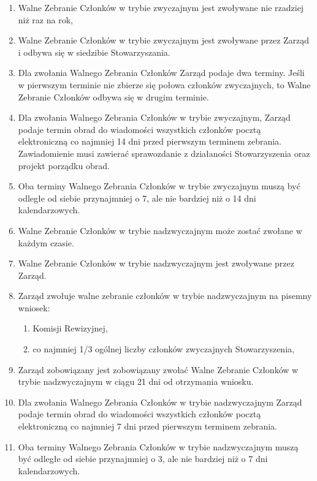 \documentclass[a4paper,draft,10pt]{article}
\begin{document}
\begin{enumerate}
\begin{enumerate}
	        \item Walne Zebranie Członków w trybie zwyczajnym jest zwoływane nie rzadziej niż raz na rok,
	        \item Walne Zebranie Członków w trybie zwyczajnym jest zwoływane przez Zarząd i odbywa się w siedzibie Stowarzyszania.
	    \item Dla zwołania Walnego Zebrania Członków Zarząd podaje dwa terminy. Jeśli w pierwszym terminie nie zbierze się połowa członków zwyczajnych, to Walne Zebranie Członków odbywa się w drugim terminie.
	    \item Dla zwołania Walnego Zebrania Członków w trybie zwyczajnym, Zarząd podaje termin obrad do wiadomości wszystkich członków pocztą elektroniczną co najmniej 14 dni przed pierwszym terminem zebrania. Zawiadomienie musi zawierać sprawozdanie z działaności Stowarzyszenia oraz projekt porządku obrad.
	    \item Oba terminy Walnego Zebrania Członków w trybie zwyczajnym muszą być odległe od siebie przynajmniej o 7, ale nie bardziej niż o 14 dni kalendarzowych.
	    \item Walne Zebranie Członków w trybie nadzwyczajnym może zostać zwołane w każdym czasie.
	    \item Walne Zebranie Członków w trybie nadzwyczajnym jest zwoływane przez Zarząd.
	    \item Zarząd zwołuje walne zebranie członków w trybie nadzwyczajnym na pisemny wniosek:
	      \begin{enumerate}
	        \item Komisji Rewizyjnej,
	        \item co najmniej 1/3 ogólnej liczby członków zwyczajnych Stowarzyszenia,
	        \end{enumerate}
	    \item Zarząd zobowiązany jest zobowiązany zwołać Walne Zebranie Członków w trybie nadzwyczajnym w ciągu 21 dni od otrzymania wniosku.
	    \item Dla zwołania Walnego Zebrania Członków w trybie nadzwyczajnym Zarząd podaje termin obrad do wiadomości wszystkich członków pocztą elektroniczną co najmniej 7 dni przed pierwszym terminem zebrania.
	    \item Oba terminy Walnego Zebrania Członków w trybie nadzwyczajnym muszą być odległe od siebie przynajmniej o 3, ale nie bardziej niż o 7 dni kalendarzowych.
	\end{enumerate}
	\end{enumerate}
\end{document}
